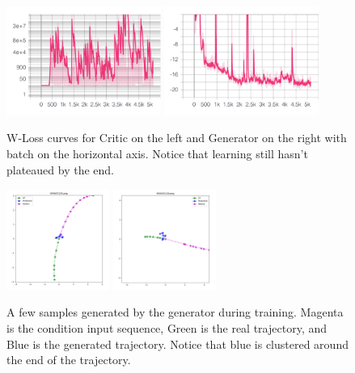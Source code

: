 \documentclass{article}
\begin{document}
\begin{figure}
    \centering
    \includegraphics[width=0.45\textwidth]{Loss_train_crit_enc}
     \includegraphics[width=0.45\textwidth]{Loss_train_gen_enc}\\
    \caption{W-Loss curves for Critic on the left and Generator on the right with batch on the horizontal axis.  Notice that learning still hasn't plateaued by the end.}
    \label{encoder_only_training}
\end{figure}

\begin{figure}
    \centering
        \includegraphics[width=0.3\textwidth]{encoder_only_1}
    \includegraphics[width=0.3\textwidth]{encoder_only_2}\\
    \caption{A few samples generated by the generator during training. Magenta is the condition input sequence, Green is the real trajectory, and Blue is the generated trajectory. Notice that blue is clustered around the end of the trajectory.}
    \label{only_encoder_samples}
\end{figure}
\end{document}
